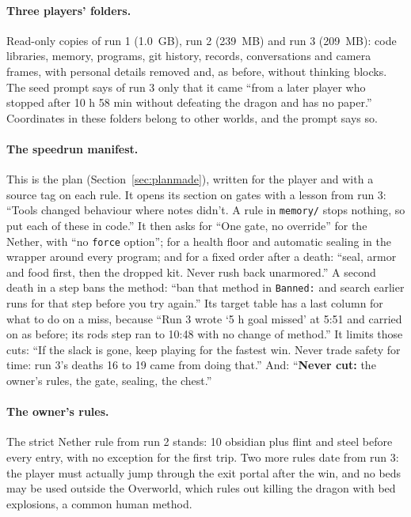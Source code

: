 \documentclass[11pt,a4paper]{article}
\begin{document}
\paragraph{Three players' folders.} Read-only copies of run 1 (1.0~GB), run 2 (239~MB) and run 3 (209~MB): code libraries, memory, programs, git history, records, conversations and camera frames, with personal details removed and, as before, without thinking blocks. The seed prompt says of run 3 only that it came ``from a later player who stopped after 10 h 58 min without defeating the dragon and has no paper.'' Coordinates in these folders belong to other worlds, and the prompt says so.

\paragraph{The speedrun manifest.} This is the plan (Section~\ref{sec:planmade}), written for the player and with a source tag on each rule. It opens its section on gates with a lesson from run 3: ``Tools changed behaviour where notes didn't. A rule in \texttt{memory/} stops nothing, so put each of these in code.'' It then asks for ``One gate, no override'' for the Nether, with ``no \texttt{force} option''; for a health floor and automatic sealing in the wrapper around every program; and for a fixed order after a death: ``seal, armor and food first, then the dropped kit. Never rush back unarmored.'' A second death in a step bans the method: ``ban that method in \texttt{Banned:} and search earlier runs for that step before you try again.'' Its target table has a last column for what to do on a miss, because ``Run 3 wrote `5 h goal missed' at 5:51 and carried on as before; its rods step ran to 10:48 with no change of method.'' It limits those cuts: ``If the slack is gone, keep playing for the fastest win. Never trade safety for time: run 3's deaths 16 to 19 came from doing that.'' And: ``\textbf{Never cut:} the owner's rules, the gate, sealing, the chest.''

\paragraph{The owner's rules.} The strict Nether rule from run 2 stands: 10 obsidian plus flint and steel before every entry, with no exception for the first trip. Two more rules date from run 3: the player must actually jump through the exit portal after the win, and no beds may be used outside the Overworld, which rules out killing the dragon with bed explosions, a common human method.
\end{document}
